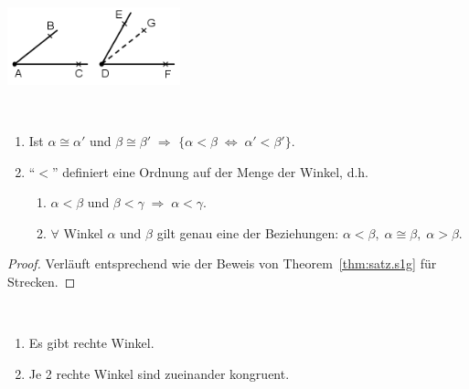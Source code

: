 \centerline{\includegraphics[width=5cm]{BILDER/1-2-16-Winkel.png}}

\begin{thm}\
    \renewcommand{\labelenumi}{\alph{enumi})} %
    \renewcommand{\labelenumii}{\alph{enumi}\textsubscript{\arabic{enumii}})}
    \begin{enumerate}
        \item Ist $\alpha \cong \alpha'$ und $\beta \cong \beta'\;\Rightarrow$ $\{\alpha < \beta\;
            \Longleftrightarrow\; \alpha' < \beta'\}$.

        \item "`$ < $"' definiert eine Ordnung auf der Menge der Winkel, d.h.
        \begin{enumerate}
            \item $\alpha < \beta$ und $\beta < \gamma\; \Rightarrow\; \alpha < \gamma$.

            \item $\forall$ Winkel $\alpha$ und $\beta$ gilt genau eine der Beziehungen: $\alpha <
                \beta,\;\alpha \cong \beta,\;\alpha > \beta$.
        \end{enumerate}
    \end{enumerate}
\end{thm}

\begin{proof}
    Verläuft entsprechend wie der Beweis von Theorem~\ref{thm:satz.s1g} für Strecken. %
\end{proof}


\begin{thm}\label{thm:satz.s1m}\
    \renewcommand{\labelenumi}{\alph{enumi})} %
    \begin{enumerate}
        \item Es gibt rechte Winkel.

        \item Je 2 rechte Winkel sind zueinander kongruent.
    \end{enumerate}
\end{thm}

